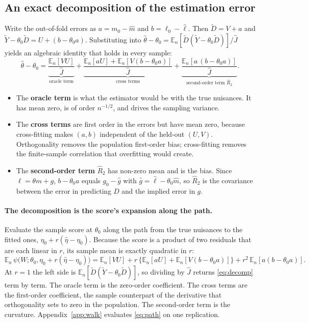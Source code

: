 \documentclass[11pt,a4paper]{article}
\newcommand{\En}{\mathbb{E}_n}
\begin{document}
\subsection{An exact decomposition of the estimation error}\label{sec:decomp}

Write the out-of-fold errors as $a=m_0-\hat m$ and $b=\ell_0-\hat\ell$. Then $\tilde D=V+a$ and $\tilde Y-\theta_0\tilde D=U+(b-\theta_0a)$. Substituting into $\hat\theta-\theta_0=\En[\tilde D(\tilde Y-\theta_0\tilde D)]/\hat J$ yields an algebraic identity that holds in every sample:
\begin{equation}\label{eq:decomp}
\hat\theta-\theta_0=\underbrace{\frac{\En[VU]}{\hat J}}_{\text{oracle term}}+\underbrace{\frac{\En[aU]+\En[V(b-\theta_0a)]}{\hat J}}_{\text{cross terms}}+\underbrace{\frac{\En[a\,(b-\theta_0a)]}{\hat J}}_{\text{second-order term }\hat R_2}.
\end{equation}
\begin{itemize}
\item The \textbf{oracle term} is what the estimator would be with the true nuisances. It has mean zero, is of order $n^{-1/2}$, and drives the sampling variance.
\item The \textbf{cross terms} are first order in the errors but have mean zero, because cross-fitting makes $(a,b)$ independent of the held-out $(U,V)$. Orthogonality removes the population first-order bias; cross-fitting removes the finite-sample correlation that overfitting would create.
\item The \textbf{second-order term} $\hat R_2$ has non-zero mean and is the bias. Since $\ell=\theta m+g$, $b-\theta_0a$ equals $g_0-\hat g$ with $\hat g=\hat\ell-\theta_0\hat m$, so $\hat R_2$ is the covariance between the error in predicting $D$ and the implied error in $g$.
\end{itemize}

\paragraph{The decomposition is the score's expansion along the path.} Evaluate the sample score at $\theta_0$ along the path from the true nuisances to the fitted ones, $\eta_0+r(\hat\eta-\eta_0)$. Because the score is a product of two residuals that are each linear in $r$, its sample mean is exactly quadratic in $r$:
\begin{equation}\tag{4$'$}\label{eq:path}
\En\,\psi\big(W;\theta_0,\eta_0+r(\hat\eta-\eta_0)\big)=\En[VU]+r\,\big\{\En[aU]+\En[V(b-\theta_0a)]\big\}+r^2\,\En[a(b-\theta_0a)].
\end{equation}
At $r=1$ the left side is $\En[\tilde D(\tilde Y-\theta_0\tilde D)]$, so dividing by $\hat J$ returns \eqref{eq:decomp} term by term. The oracle term is the zero-order coefficient. The cross terms are the first-order coefficient, the sample counterpart of the derivative that orthogonality sets to zero in the population. The second-order term is the curvature. Appendix~\ref{app:walk} evaluates \eqref{eq:path} on one replication.
\end{document}
